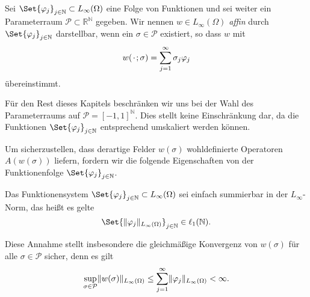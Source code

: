 \begin{Definition}
\label{def:ps:pf:omega_affin}
    Sei $\Set{\varphi_{j}}_{j \in \mathbb{N}} \subset L_{\infty}(\Omega)$ eine Folge von Funktionen und sei weiter ein Parameterraum $\mathcal P \subset \mathbb{R}^{\mathbb{N}}$ gegeben.
    Wir nennen $w \in L_{\infty}(\Omega)$ \emph{affin} durch $\Set{\varphi_{j}}_{j \in \mathbb{N}}$ darstellbar, wenn ein $\sigma \in \mathcal P$ existiert, so dass $w$ mit
    \begin{equation}
        w({\mkern2mu\cdot\mkern2mu}; \sigma) = \sum_{j = 1}^{\infty} \sigma_{j} \varphi_{j}
    \end{equation}
    übereinstimmt.
\end{Definition}

\begin{Bemerkung}
    Für den Rest dieses Kapitels beschränken wir uns bei der Wahl des Parameterraums auf $\mathcal P = [-1, 1]^{\mathbb{N}}$.
    Dies stellt keine Einschränkung dar, da die Funktionen $\Set{ \varphi_{j} }_{j \in \mathbb{N}}$ entsprechend umskaliert werden können.
\end{Bemerkung}

Um sicherzustellen, dass derartige Felder $w(\sigma)$ wohldefinierte Operatoren $A(w(\sigma))$ liefern, fordern wir die folgende Eigenschaften von der Funktionenfolge $\Set{\varphi_{j}}_{j \in \mathbb{N}}$.

\begin{Annahme}
    \label{annahme:l1_summierbar}
    Das Funktionensystem $\Set{ \varphi_{j} }_{j \in \mathbb{N}} \subset L_{\infty}(\Omega)$ sei einfach summierbar in der $L_{\infty}$-Norm, das heißt es gelte
    \begin{equation}
        \Set{ \norm{\varphi_{j}}_{L_{\infty}(\Omega) } }_{j \in \mathbb{N}} \in \ell_{1}(\mathbb{N}).
    \end{equation}
\end{Annahme}

Diese Annahme stellt insbesondere die gleichmäßige Konvergenz von $w(\sigma)$ für alle $\sigma \in \mathcal P$ sicher, denn es gilt
\begin{equation}
\label{eq:ps:pf:omega_norm_abschaetzung}
    \sup_{\sigma \in \mathcal P} \lVert w(\sigma)\rVert_{L_{\infty}(\Omega)} \leq \sum_{j = 1}^{\infty} \lVert\varphi_{j}\rVert_{L_{\infty}(\Omega)} < \infty.
\end{equation}

